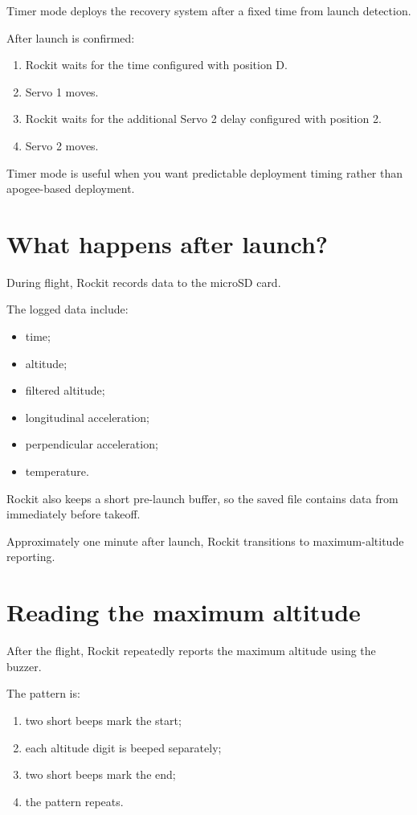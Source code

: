 \documentclass[11pt,a4paper]{article}
\begin{document}
Timer mode deploys the recovery system after a fixed time from launch detection.

After launch is confirmed:

\begin{enumerate}
    \item Rockit waits for the time configured with position D.
    \item Servo 1 moves.
    \item Rockit waits for the additional Servo 2 delay configured with position 2.
    \item Servo 2 moves.
\end{enumerate}

Timer mode is useful when you want predictable deployment timing rather than apogee-based deployment.

\section{What happens after launch?}

During flight, Rockit records data to the microSD card.

The logged data include:

\begin{itemize}
    \item time;
    \item altitude;
    \item filtered altitude;
    \item longitudinal acceleration;
    \item perpendicular acceleration;
    \item temperature.
\end{itemize}

Rockit also keeps a short pre-launch buffer, so the saved file contains data from immediately before takeoff.

Approximately one minute after launch, Rockit transitions to maximum-altitude reporting.

\section{Reading the maximum altitude}

After the flight, Rockit repeatedly reports the maximum altitude using the buzzer.

The pattern is:

\begin{enumerate}
    \item two short beeps mark the start;
    \item each altitude digit is beeped separately;
    \item two short beeps mark the end;
    \item the pattern repeats.
\end{enumerate}
\end{document}
